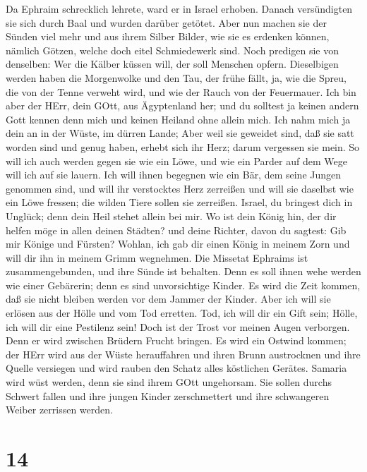  Da Ephraim schrecklich lehrete, ward er in Israel erhoben.
Danach versündigten sie sich durch Baal und wurden darüber getötet.
 Aber nun machen sie der Sünden viel mehr und aus ihrem
Silber Bilder, wie sie es erdenken können, nämlich Götzen, welche doch
eitel Schmiedewerk sind. Noch predigen sie von denselben: Wer die Kälber
küssen will, der soll Menschen opfern.  Dieselbigen werden
haben die Morgenwolke und den Tau, der frühe fällt, ja, wie die Spreu,
die von der Tenne verweht wird, und wie der Rauch von der Feuermauer.
 Ich bin aber der HErr, dein GOtt, aus Ägyptenland her; und
du solltest ja keinen andern Gott kennen denn mich und keinen Heiland
ohne allein mich.  Ich nahm mich ja dein an in der Wüste, im
dürren Lande;  Aber weil sie geweidet sind, daß sie satt
worden sind und genug haben, erhebt sich ihr Herz; darum vergessen sie
mein.  So will ich auch werden gegen sie wie ein Löwe, und
wie ein Parder auf dem Wege will ich auf sie lauern.  Ich
will ihnen begegnen wie ein Bär, dem seine Jungen genommen sind, und
will ihr verstocktes Herz zerreißen und will sie daselbst wie ein Löwe
fressen; die wilden Tiere sollen sie zerreißen.  Israel, du
bringest dich in Unglück; denn dein Heil stehet allein bei mir.
 Wo ist dein König hin, der dir helfen möge in allen deinen
Städten? und deine Richter, davon du sagtest: Gib mir Könige und
Fürsten?  Wohlan, ich gab dir einen König in meinem Zorn
und will dir ihn in meinem Grimm wegnehmen.  Die Missetat
Ephraims ist zusammengebunden, und ihre Sünde ist behalten.
 Denn es soll ihnen wehe werden wie einer Gebärerin; denn
es sind unvorsichtige Kinder. Es wird die Zeit kommen, daß sie nicht
bleiben werden vor dem Jammer der Kinder.  Aber ich will
sie erlösen aus der Hölle und vom Tod erretten. Tod, ich will dir ein
Gift sein; Hölle, ich will dir eine Pestilenz sein! Doch ist der Trost
vor meinen Augen verborgen.  Denn er wird zwischen Brüdern
Frucht bringen. Es wird ein Ostwind kommen; der HErr wird aus der Wüste
herauffahren und ihren Brunn austrocknen und ihre Quelle versiegen und
wird rauben den Schatz alles köstlichen Gerätes.  Samaria
wird wüst werden, denn sie sind ihrem GOtt ungehorsam. Sie sollen durchs
Schwert fallen und ihre jungen Kinder zerschmettert und ihre schwangeren
Weiber zerrissen werden.

\hypertarget{section-13}{%
\section{14}\label{section-13}}


